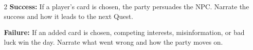 \begin{multicols}{2}
\textbf{Success:} If a player's card is chosen, the party persuades the NPC. Narrate the success and how it leads to the next Quest.

\textbf{Failure:} If an added card is chosen, competing interests, misinformation, or bad luck win the day. Narrate what went wrong and how the party moves on.

\begin{enumerate}[start=8]
\end{enumerate}

\end{multicols}
\clearpage
